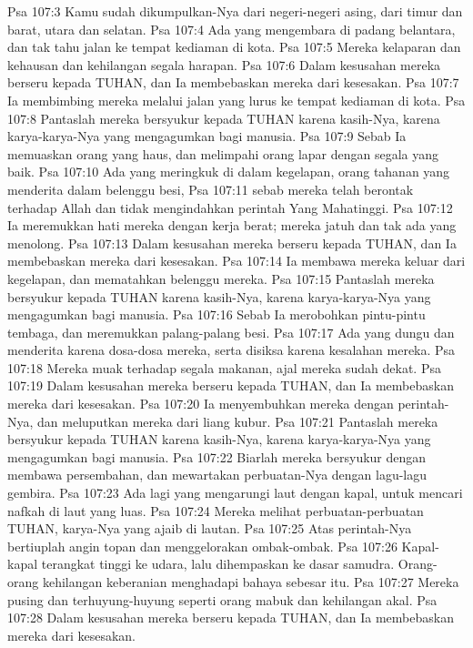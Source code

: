 Psa 107:3  Kamu sudah dikumpulkan-Nya dari negeri-negeri asing, dari timur dan barat, utara dan selatan.
Psa 107:4  Ada yang mengembara di padang belantara, dan tak tahu jalan ke tempat kediaman di kota.
Psa 107:5  Mereka kelaparan dan kehausan dan kehilangan segala harapan.
Psa 107:6  Dalam kesusahan mereka berseru kepada TUHAN, dan Ia membebaskan mereka dari kesesakan.
Psa 107:7  Ia membimbing mereka melalui jalan yang lurus ke tempat kediaman di kota.
Psa 107:8  Pantaslah mereka bersyukur kepada TUHAN karena kasih-Nya, karena karya-karya-Nya yang mengagumkan bagi manusia.
Psa 107:9  Sebab Ia memuaskan orang yang haus, dan melimpahi orang lapar dengan segala yang baik.
Psa 107:10  Ada yang meringkuk di dalam kegelapan, orang tahanan yang menderita dalam belenggu besi,
Psa 107:11  sebab mereka telah berontak terhadap Allah dan tidak mengindahkan perintah Yang Mahatinggi.
Psa 107:12  Ia meremukkan hati mereka dengan kerja berat; mereka jatuh dan tak ada yang menolong.
Psa 107:13  Dalam kesusahan mereka berseru kepada TUHAN, dan Ia membebaskan mereka dari kesesakan.
Psa 107:14  Ia membawa mereka keluar dari kegelapan, dan mematahkan belenggu mereka.
Psa 107:15  Pantaslah mereka bersyukur kepada TUHAN karena kasih-Nya, karena karya-karya-Nya yang mengagumkan bagi manusia.
Psa 107:16  Sebab Ia merobohkan pintu-pintu tembaga, dan meremukkan palang-palang besi.
Psa 107:17  Ada yang dungu dan menderita karena dosa-dosa mereka, serta disiksa karena kesalahan mereka.
Psa 107:18  Mereka muak terhadap segala makanan, ajal mereka sudah dekat.
Psa 107:19  Dalam kesusahan mereka berseru kepada TUHAN, dan Ia membebaskan mereka dari kesesakan.
Psa 107:20  Ia menyembuhkan mereka dengan perintah-Nya, dan meluputkan mereka dari liang kubur.
Psa 107:21  Pantaslah mereka bersyukur kepada TUHAN karena kasih-Nya, karena karya-karya-Nya yang mengagumkan bagi manusia.
Psa 107:22  Biarlah mereka bersyukur dengan membawa persembahan, dan mewartakan perbuatan-Nya dengan lagu-lagu gembira.
Psa 107:23  Ada lagi yang mengarungi laut dengan kapal, untuk mencari nafkah di laut yang luas.
Psa 107:24  Mereka melihat perbuatan-perbuatan TUHAN, karya-Nya yang ajaib di lautan.
Psa 107:25  Atas perintah-Nya bertiuplah angin topan dan menggelorakan ombak-ombak.
Psa 107:26  Kapal-kapal terangkat tinggi ke udara, lalu dihempaskan ke dasar samudra. Orang-orang kehilangan keberanian menghadapi bahaya sebesar itu.
Psa 107:27  Mereka pusing dan terhuyung-huyung seperti orang mabuk dan kehilangan akal.
Psa 107:28  Dalam kesusahan mereka berseru kepada TUHAN, dan Ia membebaskan mereka dari kesesakan.
